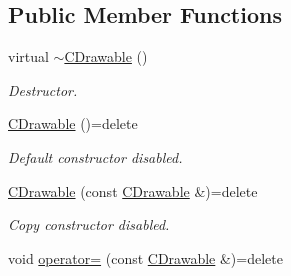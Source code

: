 \subsection*{Public Member Functions}
\begin{DoxyCompactItemize}
\item 
\hypertarget{class_c_drawable_a58fd1036856d627b19976088e4143630}{virtual \hyperlink{class_c_drawable_a58fd1036856d627b19976088e4143630}{$\sim$\+C\+Drawable} ()}\label{class_c_drawable_a58fd1036856d627b19976088e4143630}

\begin{DoxyCompactList}\small\item\em Destructor. \end{DoxyCompactList}\item 
\hypertarget{class_c_drawable_abd46d61baf3d5f5210aa3c66b98d9263}{\hyperlink{class_c_drawable_abd46d61baf3d5f5210aa3c66b98d9263}{C\+Drawable} ()=delete}\label{class_c_drawable_abd46d61baf3d5f5210aa3c66b98d9263}

\begin{DoxyCompactList}\small\item\em Default constructor disabled. \end{DoxyCompactList}\item 
\hypertarget{class_c_drawable_abec99c088c1a7c12e1d7ecae69135602}{\hyperlink{class_c_drawable_abec99c088c1a7c12e1d7ecae69135602}{C\+Drawable} (const \hyperlink{class_c_drawable}{C\+Drawable} \&)=delete}\label{class_c_drawable_abec99c088c1a7c12e1d7ecae69135602}

\begin{DoxyCompactList}\small\item\em Copy constructor disabled. \end{DoxyCompactList}\item 
\hypertarget{class_c_drawable_aabd5f52b903e57a4c8b145cb69158adb}{void \hyperlink{class_c_drawable_aabd5f52b903e57a4c8b145cb69158adb}{operator=} (const \hyperlink{class_c_drawable}{C\+Drawable} \&)=delete}\label{class_c_drawable_aabd5f52b903e57a4c8b145cb69158adb}


\end{DoxyCompactItemize}

